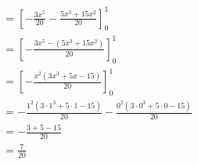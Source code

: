 \begin{align*}
	           & =  \left[-\frac{3x^5}{20}-\frac{5x^3+15x^2}{20}\right]_0^1                                          \\
	           & =  \left[-\frac{3x^5 - (5x^3+15x^2)}{20}\right]_0^1                                                 \\
	           & =  \left[-\frac{x^2(3x^3 + 5x-15)}{20}\right]_0^1                                                   \\
	           & =  -\frac{1^2(3\cdot1^3 + 5\cdot 1-15)}{20}-\frac{0^2(3\cdot 0^3 + 5\cdot 0-15)}{20}                \\
	           & =  -\frac{3 + 5-15}{20}                                                                             \\
	           & =  \frac{7}{20}                                                                                     \\
\end{align*}

